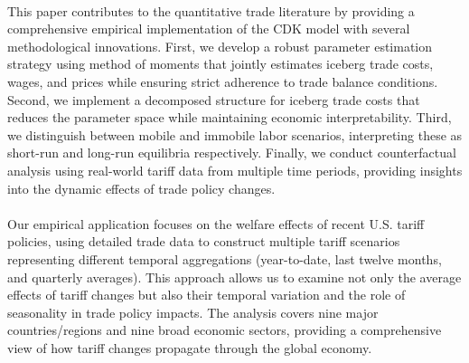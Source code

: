 \paragraph{} This paper contributes to the quantitative trade literature by providing a comprehensive empirical implementation of the CDK model with several methodological innovations. First, we develop a robust parameter estimation strategy using method of moments that jointly estimates iceberg trade costs, wages, and prices while ensuring strict adherence to trade balance conditions. Second, we implement a decomposed structure for iceberg trade costs that reduces the parameter space while maintaining economic interpretability. Third, we distinguish between mobile and immobile labor scenarios, interpreting these as short-run and long-run equilibria respectively. Finally, we conduct counterfactual analysis using real-world tariff data from multiple time periods, providing insights into the dynamic effects of trade policy changes.

\paragraph{} Our empirical application focuses on the welfare effects of recent U.S. tariff policies, using detailed trade data to construct multiple tariff scenarios representing different temporal aggregations (year-to-date, last twelve months, and quarterly averages). This approach allows us to examine not only the average effects of tariff changes but also their temporal variation and the role of seasonality in trade policy impacts. The analysis covers nine major countries/regions and nine broad economic sectors, providing a comprehensive view of how tariff changes propagate through the global economy.
